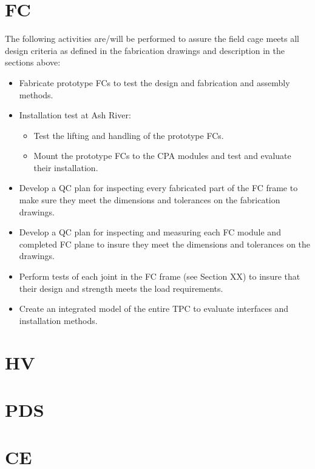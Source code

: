 \section{FC}

The following activities are/will be performed to assure the field cage meets all design criteria as defined in the fabrication drawings and description in the sections above:
\begin{itemize}
\item	Fabricate prototype FCs to test the design and fabrication and assembly methods.
\item	Installation test at Ash River:
\begin{itemize}
\item	Test the lifting and handling of the prototype FCs.
\item	Mount the prototype FCs to the CPA modules and test and evaluate their installation.
\end{itemize}
\item	Develop a QC plan for inspecting every fabricated part of the FC frame to make sure they meet the dimensions and tolerances on the fabrication drawings.
\item	Develop a QC plan for inspecting and measuring each FC module and completed FC plane to insure they meet the dimensions and tolerances on the drawings.
\item	Perform tests of each joint in the FC frame (see Section XX) to insure that their design and strength meets the load requirements.
\item	Create an integrated model of the entire TPC to evaluate interfaces and installation methods.  
\end{itemize}

\section{HV}


\section{PDS}


\section{CE}


